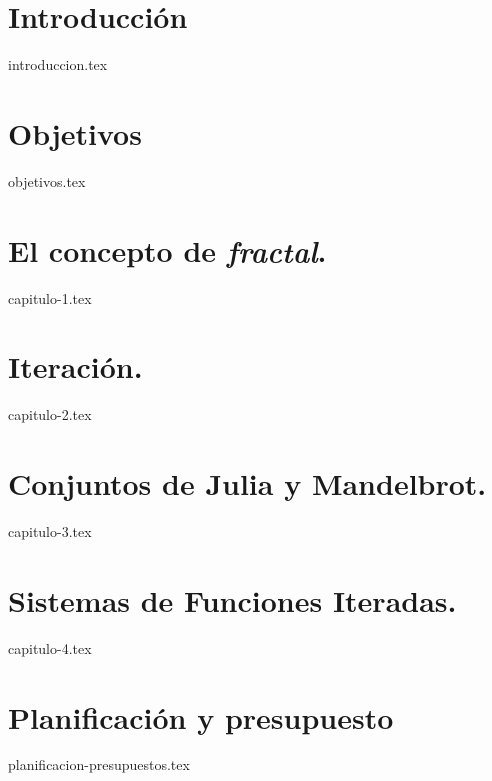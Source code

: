 \documentclass[11pt]{report}
\begin{document}

\chapter*{Introducción}
\setcounter{page}{1}


{introduccion.tex}

\chapter*{Objetivos}
\label{chap:Objetivos}

{objetivos.tex}


\chapter{El concepto de \textit{fractal}.}
\label{chap:concepto}

{capitulo-1.tex}

\chapter{Iteración.}
\label{chap:iteracion}

{capitulo-2.tex}


\chapter{Conjuntos de Julia y Mandelbrot.}
\label{chap:Julia-Mandelbrot}

{capitulo-3.tex}

\chapter{Sistemas de Funciones Iteradas.}
\label{chap:SFI}

{capitulo-4.tex}

\chapter*{Planificación y presupuesto}
\label{chap:planificacion-presupuesto}

{planificacion-presupuestos.tex}
\end{document}
